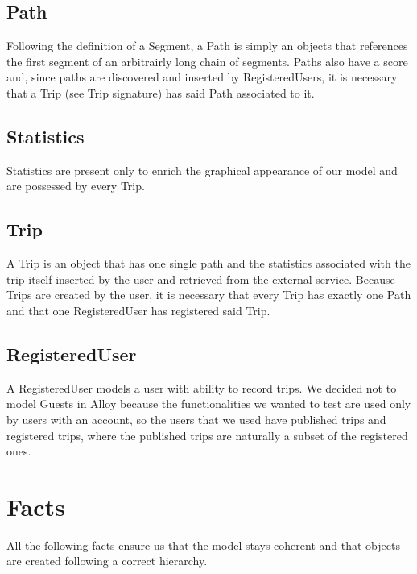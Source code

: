 \subsection{Path}

Following the definition of a Segment, a Path is simply an objects that references the first segment of an arbitrairly long chain of segments. Paths also have a score and, since paths are discovered and inserted by RegisteredUsers, it is necessary that a Trip (see Trip signature) has said Path associated to it.

\subsection{Statistics}

Statistics are present only to enrich the graphical appearance of our model and are possessed by every Trip.

\subsection{Trip}

A Trip is an object that has one single path and the statistics associated with the trip itself inserted by the user and retrieved from the external service. Because Trips are created by the user, it is necessary that every Trip has exactly one Path and that one RegisteredUser has registered said Trip.

\subsection{RegisteredUser}

A RegisteredUser models a user with ability to record trips. We decided not to model Guests in Alloy because the functionalities we wanted to test are used only by users with an account, so the users that we used have published trips and registered trips, where the published trips are naturally a subset of the registered ones.


\section{Facts}
All the following facts ensure us that the model stays coherent and that objects are created following a correct hierarchy.

